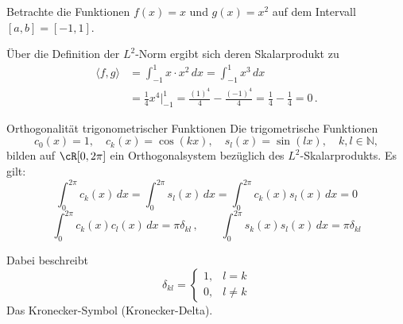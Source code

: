\begin{beispielbox}
    Betrachte die Funktionen $f(x) = x$ und $g(x) = x^2$ auf dem Intervall $[a,b] = [-1, 1]$.   

    Über die Definition der $L^2$-Norm ergibt sich deren Skalarprodukt zu
    $$
    \begin{aligned}
        \langle f,g\rangle &= \int_{-1}^{1} x \cdot x^{2} \, dx = \int_{-1}^{1} x^{3} \, dx \\
        &= \frac{1}{4} x^4 \Big|_{-1}^1 = \frac{(1)^4}{4} - \frac{(-1)^4}{4} = \frac{1}{4} - \frac{1}{4} = 0 \, .
    \end{aligned}
    $$
\end{beispielbox}

\begin{satz}{Orthogonalität trigonometrischer Funktionen}
    Die trigometrische Funktionen
    $$
        c_0(x)=1,\quad c_k(x)=\cos(kx),\quad s_l(x)=\sin(lx),\quad k,l\in\mathbb{N},
    $$
    bilden auf $\cR[0,2\pi]$ ein Orthogonalsystem bezüglich des $L^2$-Skalarprodukts.
    Es gilt:
    $$
        \int_{0}^{2\pi} c_k(x) \, dx = \int_{0}^{2\pi} s_l(x) \, dx = \int_{0}^{2\pi} c_k(x) s_l(x) \, dx = 0
    $$
    $$
        \int_{0}^{2\pi} c_k(x)c_l(x) \, dx = \pi \delta_{kl}\, , \qquad
        \int_{0}^{2\pi} s_k(x)s_l(x) \, dx = \pi \delta_{kl}    
    $$

    Dabei beschreibt
    $$
        \delta_{kl} = \begin{cases}1,& l=k\\0,& l\neq k\end{cases}
    $$
    Das Kronecker-Symbol (Kronecker-Delta).
\end{satz}

